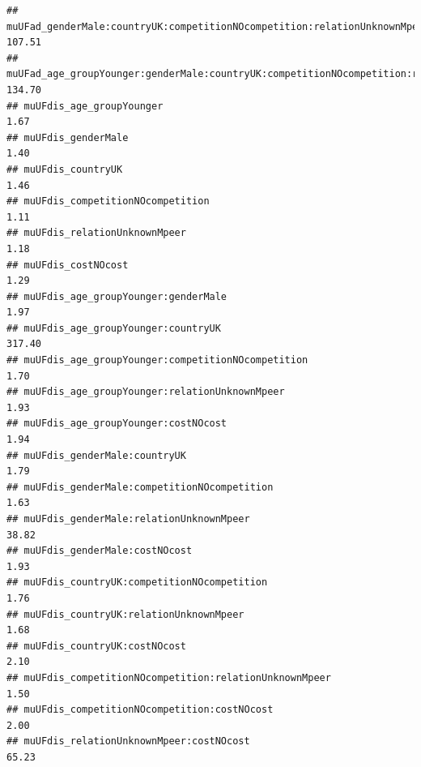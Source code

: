 \documentclass[
]{article}
\begin{document}
\begin{verbatim}
## muUFad_genderMale:countryUK:competitionNOcompetition:relationUnknownMpeer:costNOcost                      107.51
## muUFad_age_groupYounger:genderMale:countryUK:competitionNOcompetition:relationUnknownMpeer:costNOcost     134.70
## muUFdis_age_groupYounger                                                                                    1.67
## muUFdis_genderMale                                                                                          1.40
## muUFdis_countryUK                                                                                           1.46
## muUFdis_competitionNOcompetition                                                                            1.11
## muUFdis_relationUnknownMpeer                                                                                1.18
## muUFdis_costNOcost                                                                                          1.29
## muUFdis_age_groupYounger:genderMale                                                                         1.97
## muUFdis_age_groupYounger:countryUK                                                                        317.40
## muUFdis_age_groupYounger:competitionNOcompetition                                                           1.70
## muUFdis_age_groupYounger:relationUnknownMpeer                                                               1.93
## muUFdis_age_groupYounger:costNOcost                                                                         1.94
## muUFdis_genderMale:countryUK                                                                                1.79
## muUFdis_genderMale:competitionNOcompetition                                                                 1.63
## muUFdis_genderMale:relationUnknownMpeer                                                                    38.82
## muUFdis_genderMale:costNOcost                                                                               1.93
## muUFdis_countryUK:competitionNOcompetition                                                                  1.76
## muUFdis_countryUK:relationUnknownMpeer                                                                      1.68
## muUFdis_countryUK:costNOcost                                                                                2.10
## muUFdis_competitionNOcompetition:relationUnknownMpeer                                                       1.50
## muUFdis_competitionNOcompetition:costNOcost                                                                 2.00
## muUFdis_relationUnknownMpeer:costNOcost                                                                    65.23

\end{verbatim}
\end{document}

